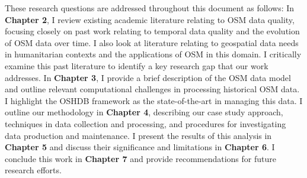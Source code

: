These research questions are addressed throughout this document as follows: In \textbf{Chapter 2}, I review existing academic literature relating to OSM data quality, focusing closely on past work relating to temporal data quality and the evolution of OSM data over time. I also look at literature relating to geospatial data needs in humanitarian contexts and the applications of OSM in this domain. I critically examine this past literature to identify a key research gap that our work addresses. In \textbf{Chapter 3}, I provide a brief description of the OSM data model and outline relevant computational challenges in processing historical OSM data. I highlight the OSHDB framework \parencite{raifer_oshdb_2019} as the state-of-the-art in managing this data. I outline our methodology in \textbf{Chapter 4}, describing our case study approach, techniques in data collection and processing, and procedures for investigating data production and maintenance. I present the results of this analysis in \textbf{Chapter 5} and discuss their significance and limitations in \textbf{Chapter 6}. I conclude this work in \textbf{Chapter 7} and provide recommendations for future research efforts. 

